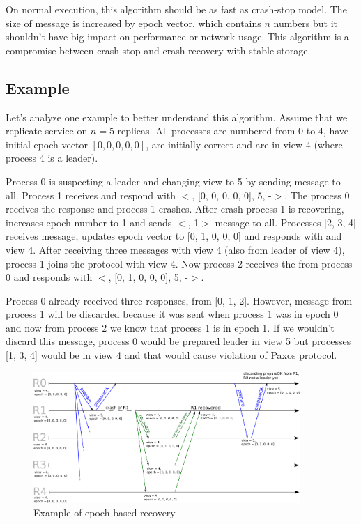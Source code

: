 On normal execution, this algorithm should be as fast as crash-stop model. \linebreak The size of \prepareOK message is increased by epoch vector, which contains $n$ numbers but it shouldn't have big impact on performance or network usage. This algorithm is a compromise between crash-stop and crash-recovery with stable storage.  

\subsection*{Example}

Let's analyze one example to better understand this algorithm. Assume that we replicate service on $n = 5$ replicas. All processes are numbered from 0 to 4, have initial epoch vector $[0, 0, 0, 0, 0]$, are initially correct and are in view 4 (where process 4 is a leader).

Process 0 is suspecting a leader and changing view to 5 by sending \prepare message to all. Process 1 receives \prepare and respond with $<$\prepareOK[], [0, 0, 0, 0, 0], 5, -$>$. The process 0 receives the response and process 1 crashes. After crash process 1 is recovering, increases epoch number to 1 and sends $<$\recovery[], 1$>$ message to all. Processes [2, 3, 4] receives \recovery message, updates epoch vector to [0, 1, 0, 0, 0] and responds with \recoveryAnswer and view 4. After receiving three \recoveryAnswer messages with view 4 (also from leader of view 4), process 1 joins the protocol with view 4. Now process 2 receives the \prepare from process 0 and responds with $<$\prepareOK[], [0, 1, 0, 0, 0], 5, -$>$.

Process 0 already received three \prepareOK responses, from [0, 1, 2]. However, message from process 1 will be discarded because it was sent when process 1 was in epoch 0 and now from process 2 we know that process 1 is in epoch 1. If we wouldn't discard this message, process 0 would be prepared leader in view 5 but processes [1, 3, 4] would be in view 4 and that would cause violation of Paxos protocol.

\begin{figure}[h]
 \centering
 \includegraphics[keepaspectratio, width=0.9\textwidth]{epoch_recovery.pdf}
 \caption{Example of epoch-based recovery}
 \label{fig:epoch_based_recovery}
\end{figure}

